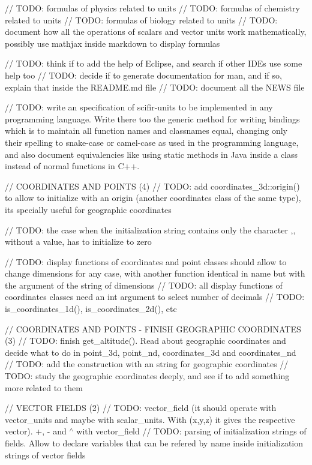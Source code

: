 // TODO\+: formulas of physics related to units // TODO\+: formulas of chemistry related to units // TODO\+: formulas of biology related to units // TODO\+: document how all the operations of scalars and vector units work mathematically, possibly use mathjax inside markdown to display formulas

// TODO\+: think if to add the help of Eclipse, and search if other IDEs use some help too // TODO\+: decide if to generate documentation for man, and if so, explain that inside the README.\+md file // TODO\+: document all the NEWS file

// TODO\+: write an specification of scifir-\/units to be implemented in any programming language. Write there too the generic method for writing bindings which is to maintain all function names and classnames equal, changing only their spelling to snake-\/case or camel-\/case as used in the programming language, and also document equivalencies like using static methods in Java inside a class instead of normal functions in C++.

// COORDINATES AND POINTS (4) // TODO\+: add coordinates\+\_\+3d\+::origin() to allow to initialize with an origin (another coordinates class of the same type), it\textquotesingle{}s specially useful for geographic coordinates

// TODO\+: the case when the initialization string contains only the character \textquotesingle{},\textquotesingle{}, without a value, has to initialize to zero

// TODO\+: display functions of coordinates and point classes should allow to change dimensions for any case, with another function identical in name but with the argument of the string of dimensions // TODO\+: all display functions of coordinates classes need an int argument to select number of decimals // TODO\+: is\+\_\+coordinates\+\_\+1d(), is\+\_\+coordinates\+\_\+2d(), etc

// COORDINATES AND POINTS -\/ FINISH GEOGRAPHIC COORDINATES (3) // TODO\+: finish get\+\_\+altitude(). Read about geographic coordinates and decide what to do in point\+\_\+3d, point\+\_\+nd, coordinates\+\_\+3d and coordinates\+\_\+nd // TODO\+: add the construction with an string for geographic coordinates // TODO\+: study the geographic coordinates deeply, and see if to add something more related to them

// VECTOR FIELDS (2) // TODO\+: vector\+\_\+field (it should operate with vector\+\_\+units and maybe with scalar\+\_\+units. With (x,y,z) it gives the respective vector). +, -\/ and \texorpdfstring{$^\wedge$}{\string^} with vector\+\_\+field // TODO\+: parsing of initialization strings of fields. Allow to declare variables that can be refered by name inside initialization strings of vector fields

